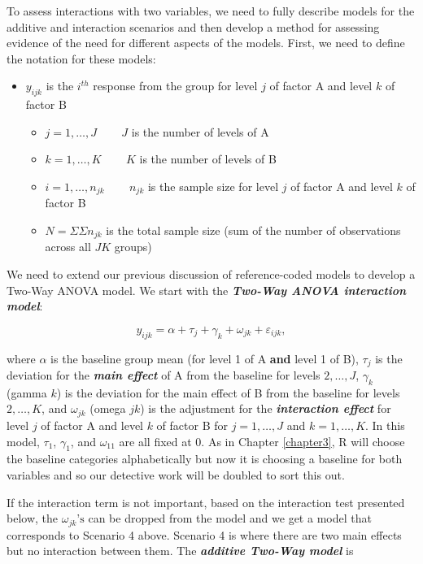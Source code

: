 \documentclass[]{book}
\theoremstyle{definition}
\theoremstyle{definition}
\theoremstyle{remark}
\begin{document}
To assess interactions with two variables, we need to fully describe
models for the additive and interaction scenarios and then develop a
method for assessing evidence of the need for different aspects of the
models. First, we need to define the notation for these models:

\begin{itemize}
\item
  \(y_{ijk}\) is the \(i^{th}\) response from the group for level \(j\)
  of factor A and level \(k\) of factor B

  \begin{itemize}
  \item
    \(j=1,\ldots,J\) ~~~ \(J\) is the number of levels of A
  \item
    \(k=1,\ldots,K\) ~~~ \(K\) is the number of levels of B
  \item
    \(i=1,\ldots,n_{jk}\) ~~~ \(n_{jk}\) is the sample size for level
    \(j\) of factor A and level \(k\) of factor B
  \item
    \(N=\Sigma\Sigma n_{jk}\) is the total sample size (sum of the
    number of observations across all \(JK\) groups)
  \end{itemize}
\end{itemize}

We need to extend our previous discussion of reference-coded models to
develop a Two-Way ANOVA model. We start with the \textbf{\emph{Two-Way
ANOVA interaction model}}:

\[y_{ijk} = \alpha + \tau_j + \gamma_k + \omega_{jk} + \varepsilon_{ijk},\]

where \(\alpha\) is the baseline group mean (for level 1 of A
\textbf{and} level 1 of B), \(\tau_j\) is the deviation for the
\textbf{\emph{main effect}} of A from the baseline for levels
\(2,\ldots,J\), \(\gamma_k\) (gamma \(k\)) is the deviation for the main
effect of B from the baseline for levels \(2,\ldots,K\), and
\(\omega_{jk}\) (omega \(jk\)) is the adjustment for the
\textbf{\emph{interaction effect}} for level \(j\) of factor A and level
\(k\) of factor B for \(j=1,\ldots,J\) and \(k=1,\ldots,K\). In this
model, \(\tau_1\), \(\gamma_1\), and \(\omega_{11}\) are all fixed at 0.
As in Chapter \ref{chapter3}, R will choose the baseline categories
alphabetically but now it is choosing a baseline for both variables and
so our detective work will be doubled to sort this out.

If the interaction term is not important, based on the interaction test
presented below, the \(\omega_{jk}\text{'s}\) can be dropped from the
model and we get a model that corresponds to Scenario 4 above. Scenario
4 is where there are two main effects but no interaction between them.
The \textbf{\emph{additive Two-Way model}} is
\end{document}
